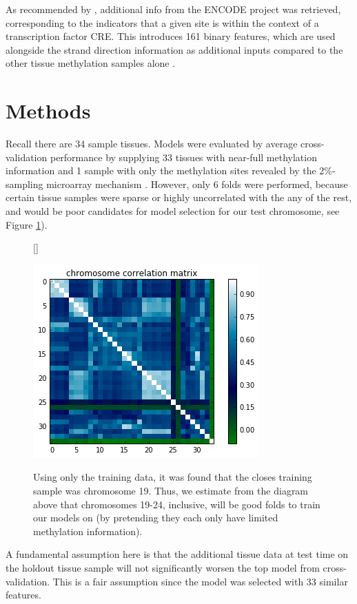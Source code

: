 \documentclass{article} %
\begin{document}
As recommended by \cite{zhang2015predicting}, additional info from the ENCODE project was retrieved, corresponding to the indicators that a given site is within the context of a transcription factor CRE. This introduces 161 binary features, which are used alongside the strand direction information as additional inputs compared to the other tissue methylation samples alone \cite{encode2004encode}.
\section{Methods}

Recall there are 34 sample tissues. Models were evaluated by average cross-validation performance by supplying 33 tissues with near-full methylation information and 1 sample with only the methylation sites revealed by the 2\%-sampling microarray mechanism \cite{infinium}. However, only 6 folds were performed, because certain tissue samples were sparse or highly uncorrelated with the any of the rest, and would be poor candidates for model selection for our test chromosome, see Figure \ref{fig:chromacorr}).

\begin{figure}[H]
    \centering
{}[\FBwidth]
{
    \caption{Using only the training data, it was found that the closes training sample was chromosome 19. Thus, we estimate from the diagram above that chromosomes 19-24, inclusive, will be good folds to train our models on (by pretending they each only have limited methylation information).}
    \label{fig:chromacorr}}
    {\includegraphics[scale=0.5]{chromacorr.png}}
\end{figure} 

A fundamental assumption here is that the additional tissue data at test time on the holdout tissue sample will not significantly worsen the top model from cross-validation. This is a fair assumption since the model was selected with 33 similar features.
\end{document}
